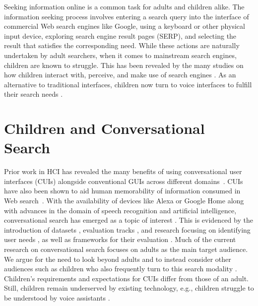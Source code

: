 \documentclass{sigchi-ext}
\newcommand{\nb}[3]{
  \fcolorbox{black}{#2}{\bfseries\sffamily\scriptsize#1}
    {\sf\small$\blacktriangleright$\textit{#3}$\blacktriangleleft$}
}
\newcommand\ug[1]{\nb{Ujwal}{cyan}{#1}}
\begin{document}
Seeking information online is a common task for adults and children alike. The information seeking process involves entering a search query into the interface of commercial Web search engines like Google, using a keyboard or other physical input device, exploring search engine result pages (SERP), and selecting the result that satisfies the corresponding need. While these actions are naturally undertaken by adult searchers, when it comes to mainstream search engines, children are known to struggle. This has been revealed by the %
many studies on how children interact with, perceive, and make use of search engines \cite{gossen2016search,gwizdka2017analysis,vanderschantz2017kids}. As an alternative to traditional interfaces, children now turn to voice interfaces to fulfill their search needs \cite{lovato2019hey,garg2020he}.

\section{Children and Conversational Search}

Prior work in HCI has revealed the many benefits of using conversational user interfaces (CUIs) alongside conventional GUIs across different domains~\cite{baier2018conversational,jung2019turtletalk}. CUIs have also been shown to aid human memorability of information consumed in Web search~\cite{qiu2020conversational,qiu2020towards}. With the availability of devices like Alexa or Google Home along with advances in the domain of speech recognition and artificial intelligence, conversational search has emerged as a topic of interest \cite{rosset2020leading,trippas2021spoken}. This is evidenced by the introduction of datasets \cite{ren2021wizard}, evaluation tracks \cite{dalton2020trec}, and research focusing on identifying user needs \cite{zhang2018towards}, as well as frameworks for their evaluation \cite{radlinski2017theoretical}. Much of the current research on conversational search focuses on adults as the main target audience. We argue for the need to look beyond adults and to instead consider other audiences such as children who also frequently turn to this search modality \cite{lovato2015siri}. Children's requirements and expectations for CUIs differ from those of an adult. Still, children remain underserved by existing technology, e.g., children struggle to be understood by voice assistants \cite{landoni2019sonny}.
\end{document}
